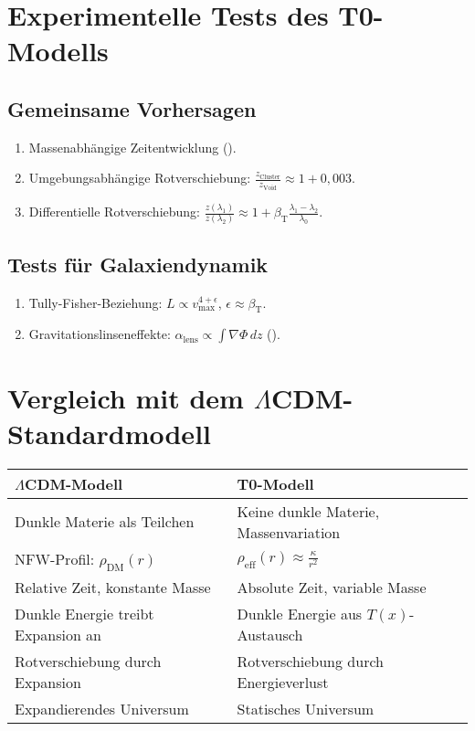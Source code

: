 \documentclass[a4paper,12pt]{article}
\theoremstyle{definition}
\theoremstyle{remark}
\newcommand{\Tfield}{T(x)}
\newcommand{\betaT}{\beta_{\text{T}}}
\begin{document}
	\section{Experimentelle Tests des T0-Modells}
	
	\subsection{Gemeinsame Vorhersagen}
	
	\begin{enumerate}
		\item Massenabhängige Zeitentwicklung (\cite{pascher_photons_2025}).
		\item Umgebungsabhängige Rotverschiebung: \(\frac{z_{\text{Cluster}}}{z_{\text{Void}}} \approx 1 + 0,003\).
		\item Differentielle Rotverschiebung: \(\frac{z(\lambda_1)}{z(\lambda_2)} \approx 1 + \betaT \frac{\lambda_1 - \lambda_2}{\lambda_0}\).
	\end{enumerate}
	
	\subsection{Tests für Galaxiendynamik}
	
	\begin{enumerate}
		\item Tully-Fisher-Beziehung: \(L \propto v_{\text{max}}^{4 + \epsilon}\), \(\epsilon \approx \betaT\).
		\item Gravitationslinseneffekte: \(\alpha_{\text{lens}} \propto \int \nabla \Phi \, dz\) (\cite{pascher_galaxies_2025}).
	\end{enumerate}
	
	\section{Vergleich mit dem \(\Lambda\)CDM-Standardmodell}
	
	\begin{tcolorbox}[colback=yellow!5!white,colframe=yellow!75!black,title=Modellvergleich]
		\begin{tabular}{p{}|p{}}
			\toprule
			\textbf{\(\Lambda\)CDM-Modell} & \textbf{T0-Modell} \\
			\midrule
			Dunkle Materie als Teilchen & Keine dunkle Materie, Massenvariation \\
			NFW-Profil: \(\rho_{\text{DM}}(r)\) & \(\rho_{\text{eff}}(r) \approx \frac{\kappa}{r^2}\) \\
			Relative Zeit, konstante Masse & Absolute Zeit, variable Masse \\
			Dunkle Energie treibt Expansion an & Dunkle Energie aus \(\Tfield\)-Austausch \\
			Rotverschiebung durch Expansion & Rotverschiebung durch Energieverlust \\
			Expandierendes Universum & Statisches Universum \\
			\bottomrule
		\end{tabular}
	\end{tcolorbox}
	
\end{document}
